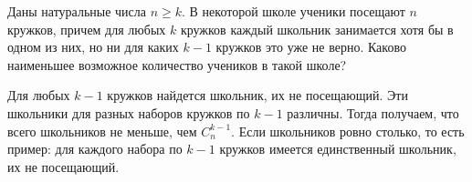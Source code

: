\problem
Даны натуральные числа $n \geq k$.
В некоторой школе ученики посещают $n$ кружков, причем для любых $k$ кружков
каждый школьник занимается хотя бы в одном из них, но ни для каких $k - 1$
кружков это уже не верно.
Каково наименьшее возможное количество учеников в такой школе?

\solution
Для любых $k - 1$ кружков найдется школьник, их не посещающий.
Эти школьники для разных наборов кружков по $k - 1$ различны.
Тогда получаем, что всего школьников не меньше, чем $C_{n}^{k - 1}$.
Если школьников ровно столько, то есть пример: для каждого набора по $k - 1$
кружков имеется единственный школьник, их не посещающий.

\endproblem
